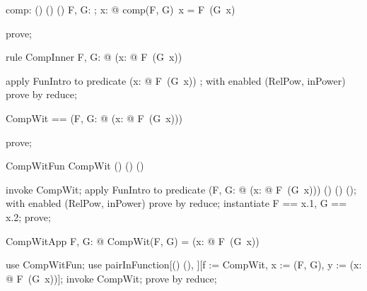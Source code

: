 \documentclass{article}
\begin{document}
\begin{axdef}
  comp: (\nat \fun \nat) \cross (\nat \fun \nat) \fun (\nat \fun \nat)
\where
   \forall F, G: \nat \fun \nat; x: \nat @ comp(F, G)~x = F~(G~x)
\end{axdef}

\begin{zproof}
prove;
\end{zproof}

\begin{theorem}{rule CompInner}
  \forall F, G: \nat \fun \nat @ (\lambda x: \nat @ F~(G~x)) \in \nat \fun \nat
\end{theorem}

\begin{zproof}
apply FunIntro to predicate (\lambda x: \nat @ F~(G~x)) \in \nat \fun \nat;
with enabled (RelPow, inPower) prove by reduce;
\end{zproof}

\begin{zed}
  CompWit == (\lambda F, G: \nat \fun \nat @ (\lambda x: \nat @ F~(G~x)))
\end{zed}

\begin{zproof}
prove;
\end{zproof}

\begin{theorem}{CompWitFun}
  CompWit \in (\nat \fun \nat) \cross (\nat \fun \nat) \fun (\nat \fun \nat)
\end{theorem}

\begin{zproof}
invoke CompWit;
apply FunIntro to predicate (\lambda F, G: \nat \fun \nat @ (\lambda x: \nat @ F~(G~x))) \in (\nat \fun \nat) \cross (\nat \fun \nat) \fun (\nat \fun \nat);
with enabled (RelPow, inPower) prove by reduce;
instantiate F == x.1, G == x.2;
prove;
\end{zproof}

\begin{theorem}{CompWitApp}
  \forall F, G: \nat \fun \nat @ CompWit(F, G) = (\lambda x: \nat @ F~(G~x))
\end{theorem}

\begin{zproof}
use CompWitFun;
use pairInFunction[(\nat \fun \nat) \cross (\nat \fun \nat), \nat \fun \nat][f := CompWit, x := (F, G), y := (\lambda x: \nat @ F~(G~x))];
invoke CompWit;
prove by reduce;
\end{zproof}
\end{document}
